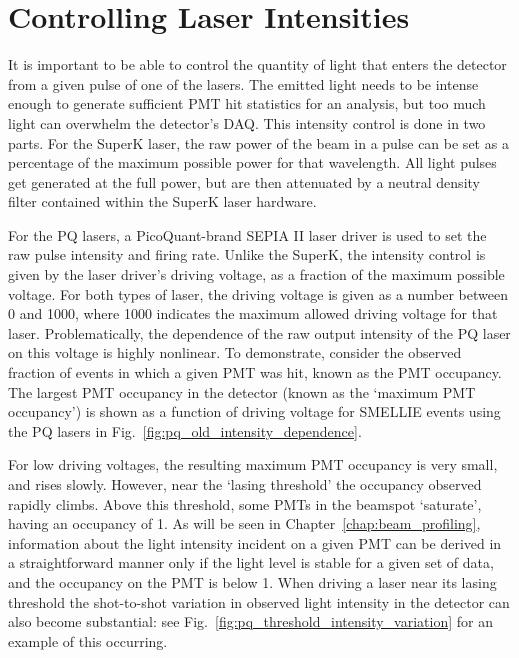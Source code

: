 \section{Controlling Laser Intensities}\label{sec:smellie_attenuators}
It is important to be able to control the quantity of light that enters the detector from a given pulse of one of the lasers. The emitted light needs to be intense enough to generate sufficient PMT hit statistics for an analysis, but too much light can overwhelm the detector's DAQ. This intensity control is done in two parts. For the SuperK laser, the raw power of the beam in a pulse can be set as a percentage of the maximum possible power for that wavelength. All light pulses get generated at the full power, but are then attenuated by a neutral density filter contained within the SuperK laser hardware.

For the PQ lasers, a PicoQuant-brand SEPIA II laser driver is used to set the raw pulse intensity and firing rate. Unlike the SuperK, the intensity control is given by the laser driver's driving voltage, as a fraction of the maximum possible voltage. For both types of laser, the driving voltage is given as a number between 0 and 1000, where 1000 indicates the maximum allowed driving voltage for that laser. Problematically, the dependence of the raw output intensity of the PQ laser on this voltage is highly nonlinear. To demonstrate, consider the observed fraction of events in which a given PMT was hit, known as the PMT occupancy. The largest PMT occupancy in the detector (known as the `maximum PMT occupancy') is shown as a function of driving voltage for SMELLIE events using the PQ lasers in Fig.~\ref{fig:pq_old_intensity_dependence}.

For low driving voltages, the resulting maximum PMT occupancy is very small, and rises slowly. However, near the `lasing threshold' the occupancy observed rapidly climbs. Above this threshold, some PMTs in the beamspot `saturate', having an occupancy of 1. As will be seen in Chapter~\ref{chap:beam_profiling}, information about the light intensity incident on a given PMT can be derived in a straightforward manner only if the light level is stable for a given set of data, and the occupancy on the PMT is below 1. When driving a laser near its lasing threshold the shot-to-shot variation in observed light intensity in the detector can also become substantial: see Fig.~\ref{fig:pq_threshold_intensity_variation} for an example of this occurring.


